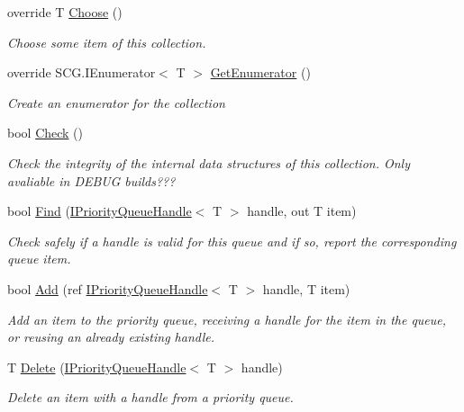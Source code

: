 \begin{DoxyCompactItemize}
override T \hyperlink{class_c5_1_1_interval_heap_a0d5fe1b0687d6ef002a17c6e46900772}{Choose} ()
\begin{DoxyCompactList}\small\item\em Choose some item of this collection. \end{DoxyCompactList}\item 
override S\+C\+G.\+I\+Enumerator$<$ T $>$ \hyperlink{class_c5_1_1_interval_heap_a09556ba66252a46d94456587bc877561}{Get\+Enumerator} ()
\begin{DoxyCompactList}\small\item\em Create an enumerator for the collection \end{DoxyCompactList}\item 
bool \hyperlink{class_c5_1_1_interval_heap_a9682f00247167989ae132c26ded9f600}{Check} ()
\begin{DoxyCompactList}\small\item\em Check the integrity of the internal data structures of this collection. Only avaliable in D\+E\+B\+U\+G builds??? \end{DoxyCompactList}\item 
bool \hyperlink{class_c5_1_1_interval_heap_abaae4e91221233de39a8062ae7c89402}{Find} (\hyperlink{interface_c5_1_1_i_priority_queue_handle}{I\+Priority\+Queue\+Handle}$<$ T $>$ handle, out T item)
\begin{DoxyCompactList}\small\item\em Check safely if a handle is valid for this queue and if so, report the corresponding queue item. \end{DoxyCompactList}\item 
bool \hyperlink{class_c5_1_1_interval_heap_a4ea1fbf9bb6c727fc83a033e311074ec}{Add} (ref \hyperlink{interface_c5_1_1_i_priority_queue_handle}{I\+Priority\+Queue\+Handle}$<$ T $>$ handle, T item)
\begin{DoxyCompactList}\small\item\em Add an item to the priority queue, receiving a handle for the item in the queue, or reusing an already existing handle. \end{DoxyCompactList}\item 
T \hyperlink{class_c5_1_1_interval_heap_a3f9868407c50d789c85e998448e50114}{Delete} (\hyperlink{interface_c5_1_1_i_priority_queue_handle}{I\+Priority\+Queue\+Handle}$<$ T $>$ handle)
\begin{DoxyCompactList}\small\item\em Delete an item with a handle from a priority queue. \end{DoxyCompactList}\item 

\end{DoxyCompactItemize}
